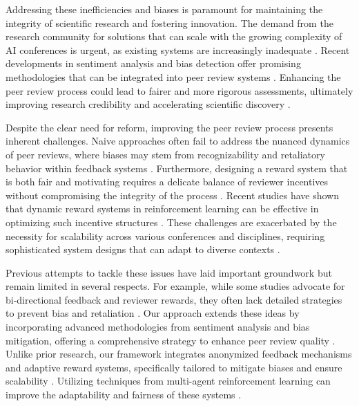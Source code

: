 \documentclass{article} %
\begin{document}
Addressing these inefficiencies and biases is paramount for maintaining the integrity of scientific research and fostering innovation. The demand from the research community for solutions that can scale with the growing complexity of AI conferences is urgent, as existing systems are increasingly inadequate \citep{a2024,endtoend2021,position2025}. Recent developments in sentiment analysis and bias detection offer promising methodologies that can be integrated into peer review systems \citep{bias2021,sentinel2025,sentinet2022,leveraging2020}. Enhancing the peer review process could lead to fairer and more rigorous assessments, ultimately improving research credibility and accelerating scientific discovery \citep{a2023}.

Despite the clear need for reform, improving the peer review process presents inherent challenges. Naive approaches often fail to address the nuanced dynamics of peer reviews, where biases may stem from recognizability and retaliatory behavior within feedback systems \citep{climb2024,disparities2025}. Furthermore, designing a reward system that is both fair and motivating requires a delicate balance of reviewer incentives without compromising the integrity of the process \citep{disparities2025,students2021,level2025}. Recent studies have shown that dynamic reward systems in reinforcement learning can be effective in optimizing such incentive structures \citep{drta2025,adversarial2019}. These challenges are exacerbated by the necessity for scalability across various conferences and disciplines, requiring sophisticated system designs that can adapt to diverse contexts \citep{latent2020,a2024}.

Previous attempts to tackle these issues have laid important groundwork but remain limited in several respects. For example, while some studies advocate for bi-directional feedback and reviewer rewards, they often lack detailed strategies to prevent bias and retaliation \citep{deriving2020,improving2017}. Our approach extends these ideas by incorporating advanced methodologies from sentiment analysis and bias mitigation, offering a comprehensive strategy to enhance peer review quality \citep{sentiment2024,discussions2022,through2021}. Unlike prior research, our framework integrates anonymized feedback mechanisms and adaptive reward systems, specifically tailored to mitigate biases and ensure scalability \citep{backdoor2023,racism2023}. Utilizing techniques from multi-agent reinforcement learning can improve the adaptability and fairness of these systems \citep{explainable2024,explaining2024}.
\end{document}

